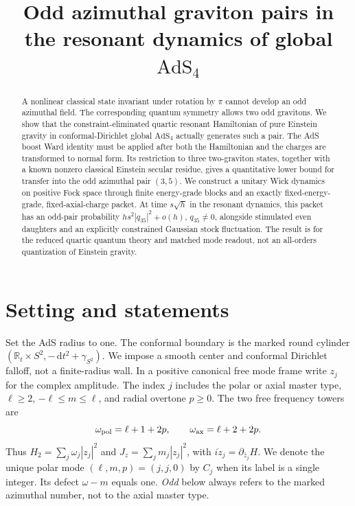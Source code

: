 \documentclass[11pt]{article}
\title{Odd azimuthal graviton pairs in the resonant dynamics of global \(\mathrm{AdS}_4\)}
\author{}
\date{}
\newcommand{\R}{\mathbb R}
\newcommand{\dd}{\,\mathrm d}
\numberwithin{equation}{section}
\begin{document}
\maketitle
\begin{abstract}
A nonlinear classical state invariant under rotation by \(\pi\) cannot
develop an odd azimuthal field. The corresponding quantum symmetry
allows two odd gravitons. We show that the constraint-eliminated
quartic resonant Hamiltonian of pure Einstein gravity in
conformal-Dirichlet global \(\mathrm{AdS}_4\) actually generates such a
pair. The AdS boost Ward identity must be applied after both the
Hamiltonian and the charges are transformed to normal form. Its
restriction to three two-graviton states, together with a known
nonzero classical Einstein secular residue, gives a quantitative
lower bound for transfer into the odd azimuthal pair \((3,5)\).
We construct a unitary Wick dynamics on positive Fock space
through finite energy-grade blocks and an exactly fixed-energy-grade,
fixed-axial-charge packet. At time \(s\sqrt h\) in the resonant
dynamics, this packet has an odd-pair probability
\(h s^2 |q_{35}|^2+o(h)\), \(q_{35}\ne0\), alongside stimulated even
daughters and an explicitly constrained Gaussian stock fluctuation.
The result is for the reduced quartic quantum theory and matched
mode readout, not an all-orders quantization of Einstein gravity.
\end{abstract}

\section{Setting and statements}\label{sec:intro}

Set the AdS radius to one. The conformal boundary is the marked round
cylinder \((\R_t\times S^2,-\dd t^2+\gamma_{S^2})\). We impose a smooth
center and conformal Dirichlet falloff, not a finite-radius wall. In a
positive canonical free mode frame write \(z_j\) for the complex
amplitude. The index \(j\) includes the polar or axial master type,
\(\ell\ge2\), \(-\ell\le m\le\ell\), and radial overtone \(p\ge0\).
The two free frequency towers are
\begin{equation}\label{eq:towers}
 \omega_{\rm pol}=\ell+1+2p,\qquad
 \omega_{\rm ax}=\ell+2+2p .
\end{equation}
Thus \(H_2=\sum_j\omega_j|z_j|^2\) and
\(J_z=\sum_jm_j|z_j|^2\), with
\(i\dot z_j=\partial_{\bar z_j}H\). We denote the unique polar mode
\((\ell,m,p)=(j,j,0)\) by \(C_j\) when its label is a single integer.
Its defect \(\omega-m\) equals one. \emph{Odd} below always refers to
the marked azimuthal number, not to the axial master type.
\end{document}
